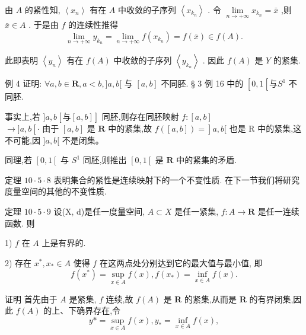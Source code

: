 由 $A$ 的紧性知, $\left\langle  {x}_{n}\right\rangle$ 有在 $A$ 中收敛的子序列 $\left\langle  {x}_{{k}_{n}}\right\rangle$ . 令 $\mathop{\lim }\limits_{{n \rightarrow   + \infty }}{x}_{{k}_{n}} = \bar{x}$ ,则 $\bar{x} \in  A$ . 于是由 $f$ 的连续性推得
$$\mathop{\lim }\limits_{{n \rightarrow   + \infty }}{y}_{{k}_{n}} = \mathop{\lim }\limits_{{n \rightarrow   + \infty }}f\left( {x}_{{k}_{n}}\right)  = f\left( \bar{x}\right)  \in  f\left( A\right) .$$

此即表明 $\left\langle  {y}_{n}\right\rangle$ 有在 $f\left( A\right)$ 中收敛的子序列 $\left\langle  {y}_{{k}_{n}}\right\rangle$ . 因此 $f\left( A\right)$ 是 $Y$ 的紧集.

例 4 证明: $\forall a,b \in  \mathbf{R},a < b,\rbrack a,b\lbrack$ 与 $\left\lbrack  {a,b}\right\rbrack$ 不同胚. § 3 例 16 中的 $\left\lbrack  {0,1\left\lbrack  {与{S}^{1}}\right. }\right.$ 不同胚.

事实上,若 $\rbrack a,b\left\lbrack  {与\left\lbrack  {a,b}\right\rbrack  }\right\rbrack$ 同胚,则存在同胚映射 $f : \left\lbrack  {a,b}\right\rbrack$  $\rightarrow  \rbrack a,b\left\lbrack  {\cdot \text{ 由于 }\left\lbrack  {a,b}\right\rbrack  \text{ 是 }\mathbf{R}\text{ 中的紧集,故 }f\left( \left\lbrack  {a,b}\right\rbrack  \right)  = }\right\rbrack  a,b\lbrack$ 也是 $\mathrm{R}$ 中的紧集,这不可能,因 $\rbrack a,b\lbrack$ 不是闭集。

同理,若 $\left\lbrack  {0,1\left\lbrack  \right. }\right.$ 与 ${S}^{1}$ 同胚,则推出 $\left\lbrack  {0,1\left\lbrack  \right. }\right.$ 是 $\mathbf{R}$ 中的紧集的矛盾.

定理 ${10} \cdot  5 \cdot  8$ 表明集合的紧性是连续映射下的一个不变性质. 在下一节我们将研究度量空间的其他的不变性质.

定理 ${10} \cdot  5 \cdot  9$ 设(X, d)是任一度量空间, $A \subset  X$ 是任一紧集, $f : A \rightarrow  \mathbf{R}$ 是任一连续函数. 则

1) $f$ 在 $A$ 上是有界的.

2) 存在 ${x}^{ * },{x}_{ * } \in  A$ 使得 $f$ 在这两点处分别达到它的最大值与最小值, 即
$$f\left( {x}^{ * }\right)  = \mathop{\sup }\limits_{{x \in  A}}f\left( x\right) ,f\left( {x}_{ * }\right)  = \mathop{\inf }\limits_{{x \in  A}}f\left( x\right) .$$

证明 首先由于 $A$ 是紧集, $f$ 连续,故 $f\left( A\right)$ 是 $\mathbf{R}$ 的紧集,从而是 $\mathbf{R}$ 的有界闭集,因此 $f\left( A\right)$ 的上、下确界存在,令
$$y *  = \mathop{\sup }\limits_{{x \in  A}}f\left( x\right) ,{y}_{ * } = \mathop{\inf }\limits_{{x \in  A}}f\left( x\right) ,$$

